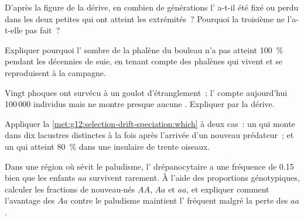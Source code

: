 \begin{exercise}[$\star\star$]\label{exo:g12:selection-drift-speciation:8}
D'après la figure de la dérive, en combien de générations l'
a-t-il été fixé ou perdu dans les deux petites  qui ont
atteint les extrémités~? Pourquoi la troisième ne l'a-t-elle pas fait~?
\end{exercise}

\begin{exercise}[$\star\star$]\label{exo:g12:selection-drift-speciation:9}
Expliquer pourquoi l' sombre de la phalène du bouleau n'a pas
atteint 100~\% pendant les décennies de suie, en tenant compte des
phalènes qui vivent et se reproduisent à la campagne.
\end{exercise}

\begin{exercise}[$\star\star$]\label{exo:g12:selection-drift-speciation:10}
Vingt phoques ont survécu à un goulot d'étranglement~; l' compte
aujourd'hui 100\,000 individus mais ne montre presque aucune . Expliquer par la dérive.
\end{exercise}

\begin{exercise}[$\star\star$]\label{exo:g12:selection-drift-speciation:11}
Appliquer la \cref{met:g12:selection-drift-speciation:which} à deux
cas~: un  qui monte dans dix  lacustres distinctes à
la fois après l'arrivée d'un nouveau prédateur~; et un  qui
atteint 80~\% dans une  insulaire de trente oiseaux.
\end{exercise}

\begin{exercise}[$\star\star\star$]\label{exo:g12:selection-drift-speciation:12}
Dans une région où sévit le paludisme, l' drépanocytaire a une
fréquence de 0.15 bien que les enfants $aa$ survivent rarement. À
l'aide des proportions génotypiques, calculer les fractions de
nouveau-nés $AA$, $Aa$ et $aa$, et expliquer comment l'avantage des
$Aa$ contre le paludisme maintient l' fréquent malgré la perte
des $aa$.
\end{exercise}

